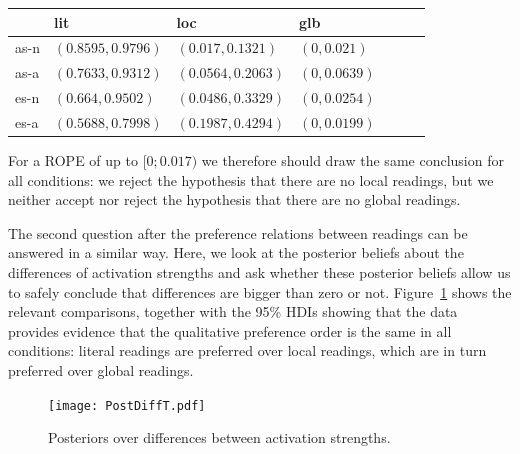\documentclass[fleqn,reqno,10pt]{article}
\begin{document}
\begin{center}
  \begin{tabular}{lllllll}
    & lit & loc & glb & \\ \midrule
    as-n & $(0.8595 , 0.9796)$ & $(0.017 , 0.1321)$
    & $(0 , 0.021)$ \\
    as-a 
    & $(0.7633 , 0.9312)$
    & $(0.0564 , 0.2063)$
    & $(0 , 0.0639)$ \\
    es-n 
    & $(0.664 , 0.9502)$
    & $(0.0486 , 0.3329)$
    & $(0 , 0.0254)$ \\
    es-a 
    & $(0.5688 , 0.7998)$
    & $(0.1987 , 0.4294)$
    & $(0 , 0.0199)$ 
  \end{tabular}
\end{center}

For a ROPE of up to $[0;0.017)$ we therefore should draw the same
conclusion for all conditions: we reject the hypothesis that there are
no local readings, but we neither accept nor reject the hypothesis
that there are no global readings.

The second question after the preference relations between readings
can be answered in a similar way. Here, we look at the posterior
beliefs about the differences of activation strengths and ask whether
these posterior beliefs allow us to safely conclude that differences
are bigger than zero or not. Figure~\ref{fig:PostDiffT} shows the
relevant comparisons, together with the 95\% HDIs showing that the
data provides evidence that the qualitative preference order is the
same in all conditions: literal readings are preferred over local
readings, which are in turn preferred over global readings.

\begin{figure}
  \centering
  \texttt{[image: PostDiffT.pdf]}
  \caption{Posteriors over differences between activation strengths.}
  \label{fig:PostDiffT}
\end{figure}


\printbibliography[heading=bibintoc]
\end{document}
